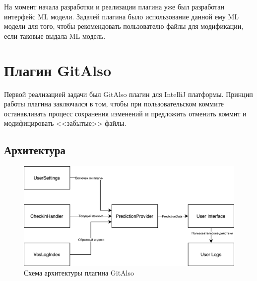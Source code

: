 На момент начала разработки и реализации плагина уже был разработан интерфейс ML модели. Задачей плагина было использование данной ему ML модели для того, чтобы рекомендовать пользователю файлы для модификации, если таковые выдала ML модель.
\section{Плагин GitAlso}
Первой реализацией задачи был GitAlso плагин для IntelliJ платформы. Принцип работы плагина заключался в том, чтобы при пользовательском коммите останавливать процесс сохранения изменений и предложить отменить коммит и модифицировать <<забытые>> файлы.
\subsection{Архитектура}
\begin{figure}[!h]
\caption{Схема архитектуры плагина GitAlso}\label{GitAlso-arch}
\centering
\includegraphics[scale=0.16]{GitAlsoArch.png}
\end{figure}
